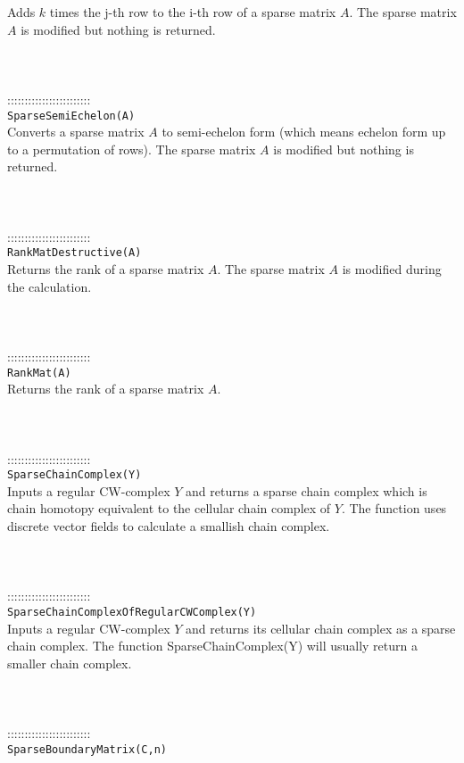 \documentclass[a4paper,11pt]{report}
\begin{document}
{ Adds $k$ times the j-th row to the i-th row of a sparse matrix $A$. The sparse matrix $A$ is modified but nothing is returned. \\
 \\
 \\
 \\
 ::::::::::::::::::::::::\\
 \texttt{SparseSemiEchelon(A)}\\
 

 Converts a sparse matrix $A$ to semi-echelon form (which means echelon form up to a permutation of rows).
The sparse matrix $A$ is modified but nothing is returned. \\
 \\
 \\
 \\
 ::::::::::::::::::::::::\\
 \texttt{RankMatDestructive(A)}\\
 

 Returns the rank of a sparse matrix $A$. The sparse matrix $A$ is modified during the calculation. \\
 \\
 \\
 \\
 ::::::::::::::::::::::::\\
 \texttt{RankMat(A)}\\
 

 Returns the rank of a sparse matrix $A$. \\
 \\
 \\
 \\
 ::::::::::::::::::::::::\\
 \texttt{SparseChainComplex(Y)}\\
 

 Inputs a regular CW-complex $Y$ and returns a sparse chain complex which is chain homotopy equivalent to the
cellular chain complex of $Y$. The function uses discrete vector fields to calculate a smallish chain
complex. \\
 \\
 \\
 \\
 ::::::::::::::::::::::::\\
 \texttt{SparseChainComplexOfRegularCWComplex(Y)}\\
 

 Inputs a regular CW-complex $Y$ and returns its cellular chain complex as a sparse chain complex. The function
SparseChainComplex(Y) will usually return a smaller chain complex. \\
 \\
 \\
 \\
 ::::::::::::::::::::::::\\
 \texttt{SparseBoundaryMatrix(C,n)}\\
 

}
\end{document}
